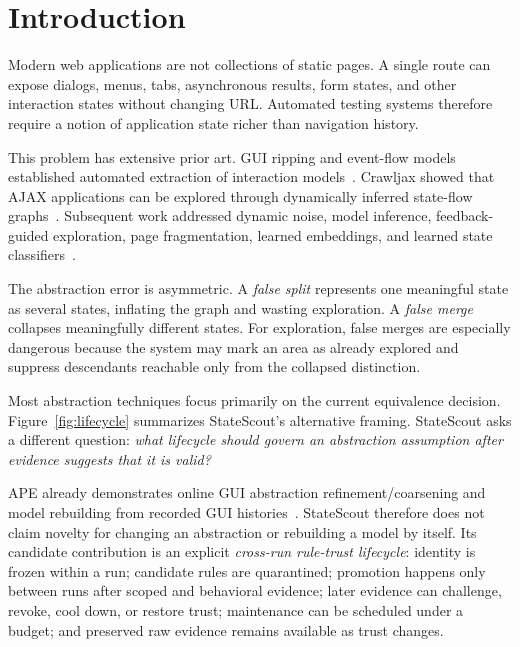 \documentclass[conference]{IEEEtran}
\begin{document}
\section{Introduction}
Modern web applications are not collections of static pages. A single route can expose dialogs, menus, tabs, asynchronous results, form states, and other interaction states without changing URL. Automated testing systems therefore require a notion of application state richer than navigation history.

This problem has extensive prior art. GUI ripping and event-flow models established automated extraction of interaction models~\cite{memon2003guiripping,memon2007eventflow}. Crawljax showed that AJAX applications can be explored through dynamically inferred state-flow graphs~\cite{mesbah2008crawling,mesbah2012crawljax}. Subsequent work addressed dynamic noise, model inference, feedback-guided exploration, page fragmentation, learned embeddings, and learned state classifiers~\cite{roest2010regression,fard2013feedback,yandrapally2023fraggen,kanaththage2026webembed,liu2026judge}.

The abstraction error is asymmetric. A \emph{false split} represents one meaningful state as several states, inflating the graph and wasting exploration. A \emph{false merge} collapses meaningfully different states. For exploration, false merges are especially dangerous because the system may mark an area as already explored and suppress descendants reachable only from the collapsed distinction.

Most abstraction techniques focus primarily on the current equivalence decision. Figure~\ref{fig:lifecycle} summarizes StateScout's alternative framing. StateScout asks a different question: \emph{what lifecycle should govern an abstraction assumption after evidence suggests that it is valid?}

APE already demonstrates online GUI abstraction refinement/coarsening and model rebuilding from recorded GUI histories~\cite{gu2019ape}. StateScout therefore does not claim novelty for changing an abstraction or rebuilding a model by itself. Its candidate contribution is an explicit \emph{cross-run rule-trust lifecycle}: identity is frozen within a run; candidate rules are quarantined; promotion happens only between runs after scoped and behavioral evidence; later evidence can challenge, revoke, cool down, or restore trust; maintenance can be scheduled under a budget; and preserved raw evidence remains available as trust changes.
\end{document}
